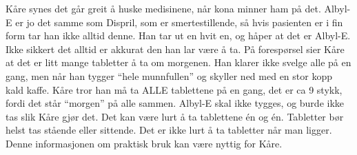 Kåre synes det går greit å huske medisinene, når kona minner ham på det. Albyl-E er jo det samme som Dispril, som er smertestillende, så hvis pasienten er i fin form tar han ikke alltid denne. Han tar ut en hvit en, og håper at det er Albyl-E. Ikke sikkert det alltid er akkurat den han lar være å ta. På forespørsel sier Kåre at det er litt mange tabletter å ta om morgenen. Han klarer ikke svelge alle på en gang, men når han tygger ``hele munnfullen'' og skyller ned med en stor kopp kald kaffe. Kåre tror han må ta ALLE tablettene på en gang, det er ca 9 stykk, fordi det står ``morgen'' på alle sammen. Albyl-E skal ikke tygges, og burde ikke tas slik Kåre gjør det. Det kan være lurt å ta tablettene én og én. Tabletter bør helst tas stående eller sittende. Det er ikke lurt å ta tabletter når man ligger. Denne informasjonen om praktisk bruk kan være nyttig for Kåre. 
